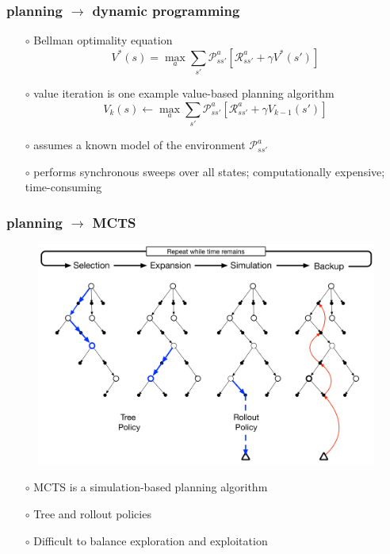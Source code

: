 \documentclass[aspectratio=169]{beamer}
\begin{document}
\begin{frame}
    \frametitle{planning $\rightarrow$ dynamic programming} 
    \begin{itemize}
        \item[$\circ$] Bellman optimality equation
        $$ V^*(s) = \max_a \sum_{s'}\mathcal{P}_{ss'}^a[\mathcal{R}_{ss'}^a + \gamma V^*(s')] $$ 
        \item[$\circ$] value iteration is one example value-based planning algorithm
        $$ V_k(s) \leftarrow \max_a \sum_{s'}\mathcal{P}_{ss'}^a[\mathcal{R}_{ss'}^a + \gamma V_{k-1}(s')] $$ 
        \item[$\circ$] assumes a known model of the environment $\mathcal{P}_{ss'}^a$ 
        \item[$\circ$] performs synchronous sweeps over all states; computationally expensive; time-consuming
    \end{itemize}
\end{frame}

\begin{frame}
    \frametitle{planning $\rightarrow$ MCTS} 
    \begin{minipage}{0.7\textwidth}
        \begin{figure}
            \centering
            \includegraphics[width=1\textwidth]{mcts.png}
        \end{figure}    
    \end{minipage}%
    \begin{minipage}{0.3\textwidth}
        \begin{itemize}
            \item[$\circ$] MCTS is a simulation-based planning algorithm
            \item[$\circ$] Tree and rollout policies
            \item[$\circ$] Difficult to balance exploration and exploitation
        \end{itemize}    
    \end{minipage}
\end{frame}
\end{document}
